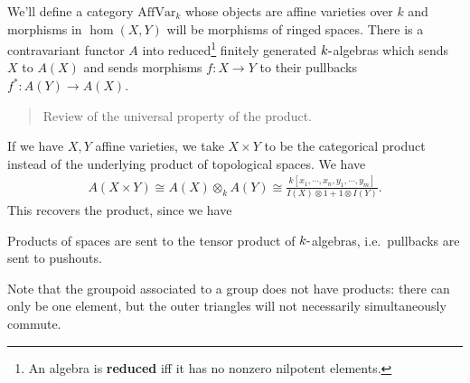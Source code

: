 We'll define a category \(\mathrm{AffVar}_k\) whose objects are affine
varieties over \(k\) and morphisms in \(\hom(X, Y)\) will be morphisms
of ringed spaces. There is a contravariant functor \(A\) into
reduced\footnote{An algebra is \textbf{reduced} iff it has no nonzero
  nilpotent elements.} finitely generated \(k{\hbox{-}}\)algebras which
sends \(X\) to \(A(X)\) and sends morphisms \(f:X\to Y\) to their
pullbacks \(f^*:A(Y) \to A(X)\).

\begin{quote}
Review of the universal property of the product.
\end{quote}

\begin{remark}

If we have \(X,Y\) affine varieties, we take \(X\times Y\) to be the
categorical product instead of the underlying product of topological
spaces. We have
\begin{align*}
A(X\times Y) \cong A(X) \otimes_k A(Y) \cong \frac{ k[x_1, \cdots, x_n, y_1, \cdots, y_m]} { I(X) \otimes 1 + 1 \otimes I(Y) }
.\end{align*}
This recovers the product, since we have

\begin{center}
\end{center}

\end{remark}

\begin{remark}

Products of spaces are sent to the tensor product of
\(k{\hbox{-}}\)algebras, i.e.~pullbacks are sent to pushouts.

\end{remark}

\begin{remark}

Note that the groupoid associated to a group does not have products:
there can only be one element, but the outer triangles will not
necessarily simultaneously commute.

\end{remark}

